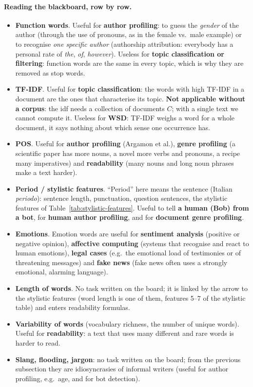 \paragraph{Reading the blackboard, row by row.}
\begin{itemize}
  \item \textbf{Function words}. Useful for \textbf{author profiling}: to guess the
        \emph{gender} of the author (through the use of pronouns, as in the female vs.\
        male example) or to recognise \emph{one specific author} (authorship
        attribution: everybody has a personal rate of \emph{the}, \emph{of},
        \emph{however}). Useless for \textbf{topic classification or filtering}: function
        words are the same in every topic, which is why they are removed as stop words.
  \item \textbf{TF-IDF}. Useful for \textbf{topic classification}: the words with high
        TF-IDF in a document are the ones that characterise its topic. \textbf{Not
        applicable without a corpus}: the idf needs a collection of documents $C$; with a
        single text we cannot compute it. Useless for \textbf{WSD}: TF-IDF weighs a word
        for a whole document, it says nothing about which sense one occurrence has.
  \item \textbf{POS}. Useful for \textbf{author profiling} (Argamon et al.),
        \textbf{genre profiling} (a scientific paper has more nouns, a novel more verbs
        and pronouns, a recipe many imperatives) and \textbf{readability} (many nouns and
        long noun phrases make a text harder).
  \item \textbf{Period / stylistic features}. ``Period'' here means the sentence
        (Italian \emph{periodo}): sentence length, punctuation, question sentences, the
        stylistic features of Table~\ref{tab:stylistic-features}. Useful to tell
        \textbf{a human (Bob) from a bot}, for \textbf{human author profiling}, and for
        \textbf{document genre profiling}.
  \item \textbf{Emotions}. Emotion words are useful for \textbf{sentiment analysis}
        (positive or negative opinion), \textbf{affective computing} (systems that
        recognise and react to human emotions), \textbf{legal cases} (e.g.\ the emotional
        load of testimonies or of threatening messages) and \textbf{fake news} (fake news
        often uses a strongly emotional, alarming language).
  \item \textbf{Length of words}. No task written on the board; it is linked by the
        arrow to the stylistic features (word length is one of them, features 5--7 of the
        stylistic table) and enters readability formulas.
  \item \textbf{Variability of words} (vocabulary richness, the number of unique words).
        Useful for \textbf{readability}: a text that uses many different and rare words
        is harder to read.
  \item \textbf{Slang, flooding, jargon}: no task written on the board; from the
        previous subsection they are idiosyncrasies of informal writers (useful for
        author profiling, e.g.\ age, and for bot detection).
\end{itemize}

